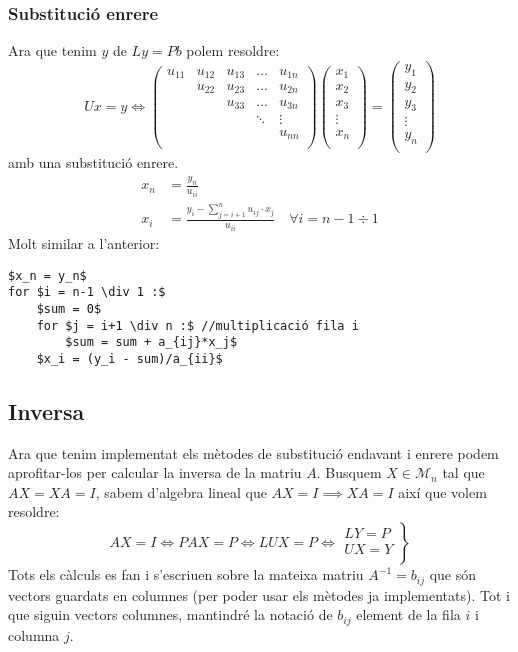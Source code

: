 \documentclass[a4paper,10pt]{article}
\begin{document}
\subsubsection{Substitució enrere}
Ara que tenim $y$ de $Ly = Pb$ polem resoldre:
\[
 Ux = y \iff
 \left(
  \begin{array}{ccccc}
  u_{11}&u_{12}	& u_{13}&	\ldots	&	u_{1n}	\\	
  		&u_{22}	& u_{23}&	\ldots	&	u_{2n}	\\
  		&		& u_{33}&	\ldots	&	u_{3n}	\\
  		&		& 		&	\ddots	&	\vdots	\\
  		&		&		&			&	u_{nn}	\\
  \end{array}
  \right)\left(
  \begin{array}{c}
   x_1 \\
   x_2 \\
   x_3 \\
   \vdots \\
   x_n \\
  \end{array}
  \right)
  =
  \left(
  \begin{array}{c}
  y_1 \\
  y_2 \\
  y_3 \\
  \vdots \\
  y_n \\
  \end{array}
  \right)
\]
amb una substitució enrere.
\begin{align*}
  x_n &= \frac{y_n}{u_{ii}} \\
  x_i &= \frac{y_i-\sum_{j=i+1}^nu_{ij}\cdot x_j}{u_{ii}} \quad \forall i = n-1 \div 1
\end{align*}
Molt similar a l'anterior:
\begin{lstlisting}[mathescape]
$x_n = y_n$
for $i = n-1 \div 1 :$
    $sum = 0$
    for $j = i+1 \div n :$ //multiplicació fila i
        $sum = sum + a_{ij}*x_j$
    $x_i = (y_i - sum)/a_{ii}$
\end{lstlisting}
\subsection{Inversa}
Ara que tenim implementat els mètodes de substitució endavant i enrere podem aprofitar-los per calcular la inversa de la matriu $A$.
Busquem $X \in \mathcal{M}_n$ tal que $AX=XA=I$, sabem d'algebra lineal que $AX=I \implies XA=I$ així que volem resoldre:
\[
  AX=I \iff PAX = P \iff LUX = P \iff \left.
  \begin{array}{c}
   LY = P \\
   UX = Y \\
  \end{array}
  \right\}
\]
Tots els càlculs es fan i s'escriuen sobre la mateixa matriu $A^{-1} = b_{ij}$ que són vectors guardats en columnes (per poder usar els mètodes ja implementats).
Tot i que siguin vectors columnes, mantindré la notació de $b_{ij}$ element de la fila $i$ i columna $j$.
\end{document}
